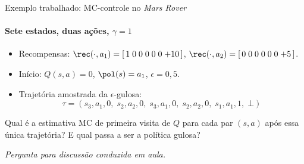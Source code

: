 \documentclass[aspectratio=169, 11pt]{beamer}
\newcommand{\paradiscussao}{\smallskip
  {\footnotesize\color{rlCinza}\itshape Pergunta para discussão conduzida em aula.}}
\begin{document}
\begin{frame}{Exemplo trabalhado: MC-controle no \emph{Mars Rover}}
  \framesubtitle{Sete estados, duas ações, $\gamma = 1$}

  \begin{center}\end{center}

  \smallskip
  \begin{itemize}\setlength{\itemsep}{0.25ex}
    \item Recompensas: $\rec(\cdot, a_1) = [\,1\;0\;0\;0\;0\;0\;{+}10\,]$,\quad
      $\rec(\cdot, a_2) = [\,0\;0\;0\;0\;0\;0\;{+}5\,]$.
    \item Início: $Q(s,a) = 0$, $\pol(s) = a_1$, $\epsilon = 0{,}5$.
    \item Trajetória amostrada da $\epsilon$-gulosa:
      \[ \tau = (s_3, a_1, 0,\; s_2, a_2, 0,\; s_3, a_1, 0,\; s_2, a_2, 0,\; s_1, a_1, 1,\; \bot) \]
  \end{itemize}

  \begin{quizbox}{}
    Qual é a estimativa MC de primeira visita de $Q$ para cada par
    $(s,a)$ após essa única trajetória? E qual passa a ser a política
    gulosa?
  \end{quizbox}
  \paradiscussao
\end{frame}
\end{document}

